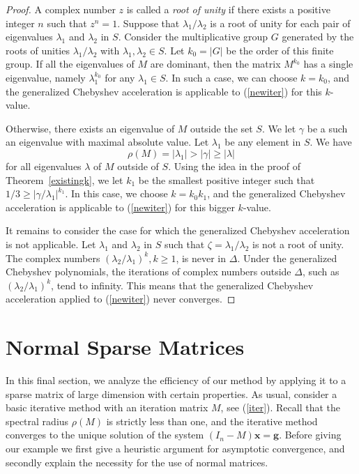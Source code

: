 \documentclass[reqno]{amsart}
\numberwithin{equation}{section}
\theoremstyle{plain}
\theoremstyle{definition}
\begin{document}
\begin{proof} A complex number $z$ is called a \textit{root of unity} if there exists a positive integer $n$ such that $z^n=1$. Suppose that $\lambda_1/\lambda_2$ is a root of unity for each pair of eigenvalues $\lambda_{1}$ and $\lambda_2$ in $S$. Consider the multiplicative group $G$ generated by the roots of unities $\lambda_1/\lambda_2$ with $\lambda_{1},\lambda_2 \in S$. Let $k_0=|G|$ be the order of this finite group. If all the eigenvalues of $M$ are dominant, then the matrix $M^{k_0}$ has a single eigenvalue, namely $\lambda_1^{k_0}$ for any $\lambda_1 \in S$. In such a case, we can choose $k=k_0$, and the generalized Chebyshev acceleration is applicable to (\ref{newiter}) for this $k$-value.
	
Otherwise, there exists an eigenvalue of $M$ outside the set $S$. We let $\gamma$ be a such an eigenvalue with maximal absolute value. Let $\lambda_1$ be any element in $S$. We have $$\rho(M) = |\lambda_1| > |\gamma| \geq |\lambda|$$
for all eigenvalues $\lambda$ of $M$ outside of $S$. Using the idea in the proof of Theorem~\ref{existingk}, we let $k_1$ be the smallest positive integer such that  $1/3 \geq |\gamma/\lambda_1|^{k_1}$. In this case, we choose $k=k_0k_1$, and the generalized Chebyshev acceleration is applicable to (\ref{newiter}) for this bigger $k$-value.
	
It remains to consider the case for which the generalized Chebyshev acceleration is not applicable. Let $\lambda_{1}$ and $\lambda_2$ in $S$ such that $\zeta= \lambda_1/\lambda_2$ is not a root of unity. The complex numbers $(\lambda_2/\lambda_1)^{k}, k\geq 1$, is never in $\Delta$. Under the generalized Chebyshev polynomials, the iterations of complex numbers outside $\Delta$, such as $(\lambda_2/\lambda_1)^{k}$, tend to infinity. This means that the generalized Chebyshev acceleration applied to (\ref{newiter}) never converges. 
\end{proof}


	
\section{Normal Sparse Matrices}
In this final section, we analyze the efficiency of our method by applying it to a sparse matrix of large dimension with certain properties. As usual, consider a basic iterative method with an iteration matrix $M$, see (\ref{iter}). Recall that the spectral radius $\rho(M)$ is strictly less than one, and the iterative method converges to the unique solution of the system $(I_n-M)\mathbf{x}=\mathbf{g}$. Before giving our example we first give a heuristic argument for asymptotic convergence, and secondly explain the necessity for the use of normal matrices. 
\end{document}
